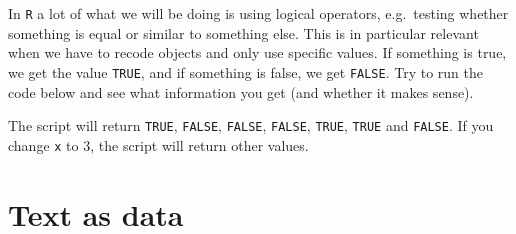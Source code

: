 \documentclass[12pt,oneside]{reedthesis}
\theoremstyle{definition}
\theoremstyle{definition}
\theoremstyle{definition}
\theoremstyle{remark}
\begin{document}
  In \texttt{R} a lot of what we will be doing is using logical operators,
  e.g.~testing whether something is equal or similar to something else.
  This is in particular relevant when we have to recode objects and only
  use specific values. If something is true, we get the value
  \texttt{TRUE}, and if something is false, we get \texttt{FALSE}. Try to
  run the code below and see what information you get (and whether it
  makes sense).
  \begin{Shaded}
  \begin{Highlighting}[]
  \StringTok{ }
  
  \OperatorTok{==}\StringTok{ }        
  \OperatorTok{==}\StringTok{ }        
  \OperatorTok{!=}\StringTok{ }        
  \OperatorTok{<}\StringTok{ }         
  \OperatorTok{>}\StringTok{ }         
  \OperatorTok{<=}\StringTok{ }        
  \OperatorTok{>=}\StringTok{ }     
  \end{Highlighting}
  \end{Shaded}
  The script will return \texttt{TRUE}, \texttt{FALSE}, \texttt{FALSE},
  \texttt{FALSE}, \texttt{TRUE}, \texttt{TRUE} and \texttt{FALSE}. If you
  change \texttt{x} to 3, the script will return other values.
  
  \section{Text as data}\label{text-as-data}
  
\end{document}
